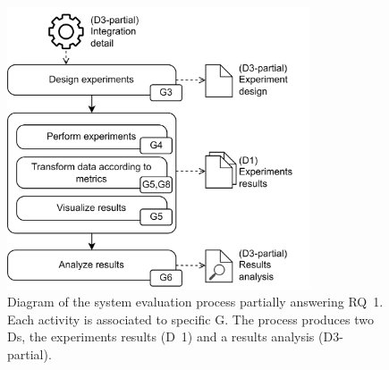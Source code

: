 \begin{figure}[!ht]
    \begin{center}
    \includegraphics[width=0.8\textwidth]{figures/3-method/method_exp.png}
    \caption[System evaluation process - Hudi vs. Iceberg]{Diagram of the system evaluation process partially answering \gls{RQ}~1. Each activity is associated to specific \gls{G}. The process produces two \glspl{D}, the experiments results (\gls{D}~1) and a results analysis (\gls{D}3-partial).}
    \label{fig:method_experiments}
    \end{center}
\end{figure}



